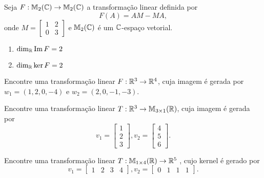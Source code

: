 \documentclass[12pt]{exam}
\begin{document}
\begin{exercicio}\label{nucleo_imagem_fim}
  Seja $F : \mathbb{M}_2(\mathbb{C}) \to \mathbb{M}_2(\mathbb{C})$ a transforma\c{c}\~ao linear definida por
  \[
  F(A) = AM - MA,
  \]
  onde $M = \begin{bmatrix}
    1 & 2\\0 & 3
  \end{bmatrix}$ e $\mathbb{M}_2(\mathbb{C})$ \'e um $\mathbb{C}$-espa\c{c}o vetorial.
  \begin{solucao}
    \begin{enumerate}[label=({\alph*})]
      \item $\dim_{\mathbb{R}}{\rm Im\,} F = 2$
      \item $\dim_{\mathbb{R}}\ker F = 2$
    \end{enumerate}
  \end{solucao}
\end{exercicio}


\begin{exercicio}
  Encontre uma transforma\c{c}\~ao linear $F : \mathbb{R}^3 \to \mathbb{R}^4$, cuja imagem \'e gerada por $w_1 = (1,2,0,-4)$ e $w_2 = (2,0,-1,-3)$.
\end{exercicio}

\begin{exercicio}
  Encontre uma transforma\c{c}\~ao linear $T : \mathbb{R}^3 \to \mathbb{M}_{3 \times 1}(\mathbb{R})$, cuja imagem \'e gerada por
  \[
  v_1 = \begin{bmatrix}
    1\\2\\3
  \end{bmatrix}, v_2 = \begin{bmatrix}
    4\\5\\6
  \end{bmatrix}.
  \]
\end{exercicio}

\begin{exercicio}
  Encontre uma transforma\c{c}\~ao linear $T : \mathbb{M}_{1 \times 4}(\mathbb{R}) \to \mathbb{R}^5$ , cujo kernel \'e gerado por
  \[
  v_1 = \begin{bmatrix}
    1 & 2 & 3 & 4
  \end{bmatrix}, v_2 = \begin{bmatrix}
    0 & 1 & 1 & 1
  \end{bmatrix}.
  \]
\end{exercicio}
\end{document}
